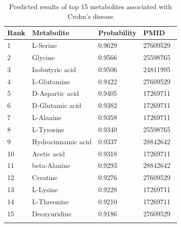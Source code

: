 \documentclass[a4paper,fleqn]{cas-dc}
\begin{document}
\begin{table}[h]
	\centering
	\vspace{-3mm} %
	\caption{Predicted results of top 15 metabolites associated with Crohn's disease}
	\begin{tabular}{llll}
		\toprule
		Rank & Metabolite & Probability & PMID \\ 
		\midrule
		
		1&	L-Serine&	0.9629&	27609529 \\
		2&	Glycine&	0.9566&	25598765 \\
		3&	Isobutyric acid&0.9506& 24811995 \\
		4&	L-Glutamine&	0.9422&	27609529 \\
		5&	D-Aspartic acid&	0.9405&	17269711 \\
		6&	D-Glutamic acid&	0.9382&	17269711 \\
		7&	L-Alanine&	0.9358&	17269711 \\
		8&	L-Tyrosine&	0.9340&	25598765 \\
		9&	Hydrocinnamic acid&	0.9337&	28842642 \\
		10&	Acetic acid&	0.9318&	17269711 \\
		11&	beta-Alanine&	0.9293&	28842642 \\
		12&	Creatine&	0.9276&	27609529 \\
		13&	L-Lysine&	0.9228&	17269711 \\
		14&	L-Threonine&	0.9210&	17269711 \\
		15&	Deoxyuridine&	0.9186&	27609529 \\
		
		\bottomrule
		\vspace{-5mm} %
		\label{table4}
	\end{tabular}
\end{table}
\end{document}
